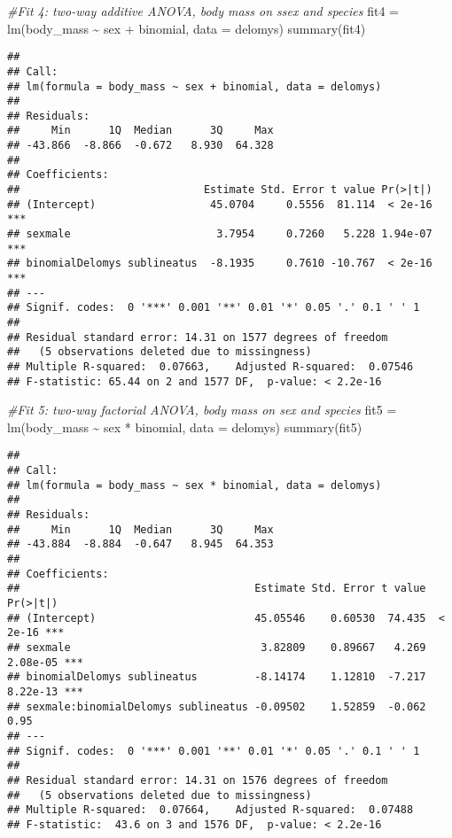 \documentclass[
]{article}
\newenvironment{Shaded}{\begin{snugshade}}{\end{snugshade}}
\newcommand{\AttributeTok}[1]{\textcolor[rgb]{0.77,0.63,0.00}{#1}}
\newcommand{\CommentTok}[1]{\textcolor[rgb]{0.56,0.35,0.01}{\textit{#1}}}
\newcommand{\FunctionTok}[1]{\textcolor[rgb]{0.00,0.00,0.00}{#1}}
\newcommand{\NormalTok}[1]{#1}
\newcommand{\OtherTok}[1]{\textcolor[rgb]{0.56,0.35,0.01}{#1}}
\newcommand{\SpecialCharTok}[1]{\textcolor[rgb]{0.00,0.00,0.00}{#1}}
\begin{document}
\begin{Shaded}
\begin{Highlighting}[]
\CommentTok{\#Fit 4: two{-}way additive ANOVA, body mass on ssex and species}
\NormalTok{fit4 }\OtherTok{=} \FunctionTok{lm}\NormalTok{(body\_mass }\SpecialCharTok{\textasciitilde{}}\NormalTok{ sex }\SpecialCharTok{+}\NormalTok{ binomial, }\AttributeTok{data =}\NormalTok{ delomys)}
\FunctionTok{summary}\NormalTok{(fit4)}
\end{Highlighting}
\end{Shaded}

\begin{verbatim}
## 
## Call:
## lm(formula = body_mass ~ sex + binomial, data = delomys)
## 
## Residuals:
##     Min      1Q  Median      3Q     Max 
## -43.866  -8.866  -0.672   8.930  64.328 
## 
## Coefficients:
##                             Estimate Std. Error t value Pr(>|t|)    
## (Intercept)                  45.0704     0.5556  81.114  < 2e-16 ***
## sexmale                       3.7954     0.7260   5.228 1.94e-07 ***
## binomialDelomys sublineatus  -8.1935     0.7610 -10.767  < 2e-16 ***
## ---
## Signif. codes:  0 '***' 0.001 '**' 0.01 '*' 0.05 '.' 0.1 ' ' 1
## 
## Residual standard error: 14.31 on 1577 degrees of freedom
##   (5 observations deleted due to missingness)
## Multiple R-squared:  0.07663,    Adjusted R-squared:  0.07546 
## F-statistic: 65.44 on 2 and 1577 DF,  p-value: < 2.2e-16
\end{verbatim}

\begin{Shaded}
\begin{Highlighting}[]
\CommentTok{\#Fit 5: two{-}way factorial ANOVA, body mass on sex and species}
\NormalTok{fit5 }\OtherTok{=} \FunctionTok{lm}\NormalTok{(body\_mass }\SpecialCharTok{\textasciitilde{}}\NormalTok{ sex }\SpecialCharTok{*}\NormalTok{ binomial, }\AttributeTok{data =}\NormalTok{ delomys)}
\FunctionTok{summary}\NormalTok{(fit5)}
\end{Highlighting}
\end{Shaded}

\begin{verbatim}
## 
## Call:
## lm(formula = body_mass ~ sex * binomial, data = delomys)
## 
## Residuals:
##     Min      1Q  Median      3Q     Max 
## -43.884  -8.884  -0.647   8.945  64.353 
## 
## Coefficients:
##                                     Estimate Std. Error t value Pr(>|t|)    
## (Intercept)                         45.05546    0.60530  74.435  < 2e-16 ***
## sexmale                              3.82809    0.89667   4.269 2.08e-05 ***
## binomialDelomys sublineatus         -8.14174    1.12810  -7.217 8.22e-13 ***
## sexmale:binomialDelomys sublineatus -0.09502    1.52859  -0.062     0.95    
## ---
## Signif. codes:  0 '***' 0.001 '**' 0.01 '*' 0.05 '.' 0.1 ' ' 1
## 
## Residual standard error: 14.31 on 1576 degrees of freedom
##   (5 observations deleted due to missingness)
## Multiple R-squared:  0.07664,    Adjusted R-squared:  0.07488 
## F-statistic:  43.6 on 3 and 1576 DF,  p-value: < 2.2e-16
\end{verbatim}
\end{document}
